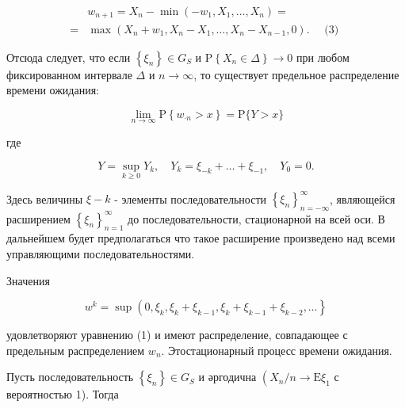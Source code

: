 \documentclass[10pt]{article}
\begin{document}
\[

\begin{aligned}

& w_{n+1}=X_{n}-\min \left(-w_{1}, X_{1}, \ldots, X_{n}\right)= \\

= & \max \left(X_{n}+w_{1}, X_{n}-X_{1}, \ldots, X_{n}-X_{n-1}, 0\right) . \quad \text { (3) }

\end{aligned}

\]



Отсюда следует, что если $\left\{\xi_{n}\right\} \in G_{S}$ и $\mathrm{P}\left\{X_{n} \in \Delta\right\} \rightarrow 0$ при любом фиксированном интервале $\Delta$ и $n \rightarrow \infty$, то существует предельное распределение времени ожидания:



\[

\lim _{n \rightarrow \infty} \mathrm{P}\left\{w_{\cdot n}>x\right\}=\mathrm{P}\{Y>x\}

\]



где



\[

Y=\sup _{k \geqslant 0} Y_{k}, \quad Y_{k}=\xi_{-k}+\ldots+\xi_{-1}, \quad Y_{0}=0 .

\]



Здесь величины $\xi-k$ - элементы последовательности $\left\{\xi_{n}\right\}_{n=-\infty}^{\infty}$, являющейся расширением $\left\{\xi_{n}\right\}_{n=1}^{\infty}$ до последовательности, стационарной на всей оси. В дальнейшем будет предполагаться что такое расширение произведено над всеми управляющими последовательностями.



Значения



\[

w^{k}=\sup \left(0, \xi_{k}, \xi_{k}+\xi_{k-1}, \xi_{k}+\xi_{k-1}+\xi_{k-2}, \ldots\right\}

\]



удовлетворяют уравнению (1) и имеют распределение, совпадающее с предельным распределением $w_{n}$. Этостационарный процесс времени ожидания.



Пусть последовательность $\left\{\xi_{n}\right\} \in G_{S}$ и әргодична $\left(X_{n} / n \rightarrow \mathrm{E} \xi_{1}\right.$ с вероятностью 1). Тогда
\end{document}
